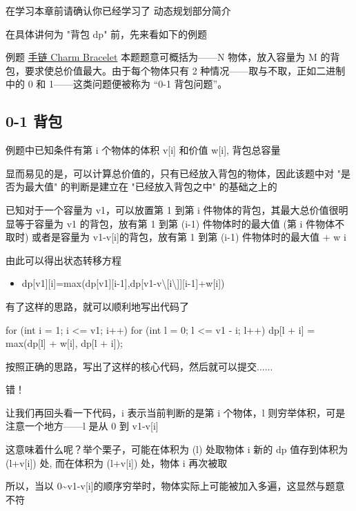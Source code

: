 
在学习本章前请确认你已经学习了 动态规划部分简介 

在具体讲何为 "背包 dp" 前，先来看如下的例题

\begin{NOTE}{例题 \href{https://www.luogu.org/problemnew/show/P2871}{手链 Charm Bracelet}}{}
本题题意可概括为——N 物体，放入容量为 M 的背包，要求使总价值最大。由于每个物体只有 2 种情况——取与不取，正如二进制中的 0 和 1——这类问题便被称为 “0-1 背包问题”。

\end{NOTE}


\subsection{0-1 背包}

例题中已知条件有第 i 个物体的体积 v[i] 和价值 w[i], 背包总容量

显而易见的是，可以计算总价值的，只有已经放入背包的物体，因此该题中对 "是否为最大值" 的判断是建立在 "已经放入背包之中" 的基础之上的

已知对于一个容量为 v1，可以放置第 1 到第 i 件物体的背包，其最大总价值很明显等于容量为 v1 的背包，放有第 1 到第 (i-1) 件物体时的最大值 (第 i 件物体不取时) 或者是容量为 v1-v[i]的背包，放有第 1 到第 (i-1) 件物体时的最大值 + w i 

由此可以得出状态转移方程

\begin{itemize}
\item dp[v1][i]=max(dp[v1][i-1],dp[v1-v\textbackslash{}[i\textbackslash{}]][i-1]+w[i])
\end{itemize}

有了这样的思路，就可以顺利地写出代码了

\begin{cppcode}
for (int i = 1; i <= v1; i++)
  for (int l = 0; l <= v1 - i; l++) dp[l + i] = max(dp[l] + w[i], dp[l + i]);
\end{cppcode}

按照正确的思路，写出了这样的核心代码，然后就可以提交......

错！

让我们再回头看一下代码，i 表示当前判断的是第 i 个物体，l 则穷举体积，可是注意一个地方——l 是从 0 到 v1-v[i]

这意味着什么呢？举个栗子，可能在体积为 (l) 处取物体 i 新的 dp 值存到体积为 (l+v[i]) 处, 而在体积为 (l+v[i]) 处，物体 i 再次被取

所以，当以 0\textasciitilde{}v1-v[i]的顺序穷举时，物体实际上可能被加入多遍，这显然与题意不符

